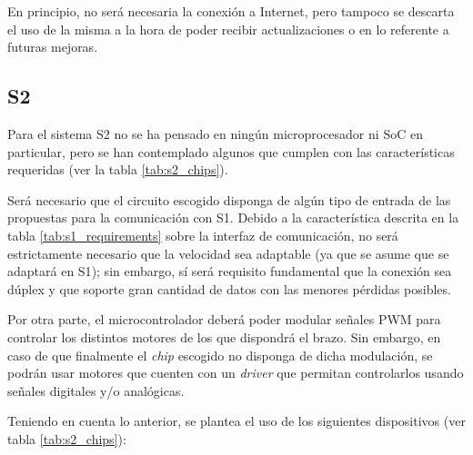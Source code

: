 En principio, no será necesaria la conexión a Internet, pero tampoco se descarta el uso de la misma a la hora de poder recibir actualizaciones o en lo referente a futuras mejoras.

\subsection*{\ac{S2}}
Para el sistema \ac{S2} no se ha pensado en ningún microprocesador ni \ac{SoC} en particular, pero se han contemplado algunos que cumplen con las características requeridas (ver la tabla \ref{tab:s2_chips}).

Será necesario que el circuito escogido disponga de algún tipo de entrada de las propuestas para la comunicación con \ac{S1}. Debido a la característica descrita en la tabla \ref{tab:s1_requirements} sobre la interfaz de comunicación, no será estrictamente necesario que la velocidad sea adaptable (ya que se asume que se adaptará en \ac{S1}); sin embargo, sí será requisito fundamental que la conexión sea dúplex y que soporte gran cantidad de datos con las menores pérdidas posibles.

Por otra parte, el microcontrolador deberá poder modular señales \ac{PWM} para controlar los distintos motores de los que dispondrá el brazo. Sin embargo, en caso de que finalmente el \textit{chip} escogido no disponga de dicha modulación, se podrán usar motores que cuenten con un \textit{driver} que permitan controlarlos usando señales digitales y/o analógicas.

Teniendo en cuenta lo anterior, se plantea el uso de los siguientes dispositivos (ver tabla \ref{tab:s2_chips}):

